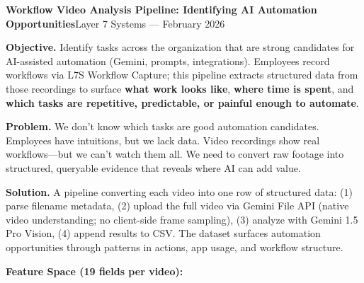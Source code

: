 \documentclass[9pt]{article}
\begin{document}
{\bfseries\large Workflow Video Analysis Pipeline: Identifying AI Automation Opportunities}\hfill{\small Layer 7 Systems — February 2026}

\medskip

\textbf{Objective.}
Identify tasks across the organization that are strong candidates for AI-assisted automation (Gemini, prompts, integrations). Employees record workflows via L7S Workflow Capture; this pipeline extracts structured data from those recordings to surface \textbf{what work looks like}, \textbf{where time is spent}, and \textbf{which tasks are repetitive, predictable, or painful enough to automate}.

\textbf{Problem.}
We don't know which tasks are good automation candidates. Employees have intuitions, but we lack data. Video recordings show real workflows—but we can't watch them all. We need to convert raw footage into structured, queryable evidence that reveals where AI can add value.

\textbf{Solution.}
A pipeline converting each video into one row of structured data: (1) parse filename metadata, (2) upload the full video via Gemini File API (native video understanding; no client-side frame sampling), (3) analyze with Gemini 1.5 Pro Vision, (4) append results to CSV. The dataset surfaces automation opportunities through patterns in actions, app usage, and workflow structure.

\textbf{Feature Space (19 fields per video):}
\end{document}
